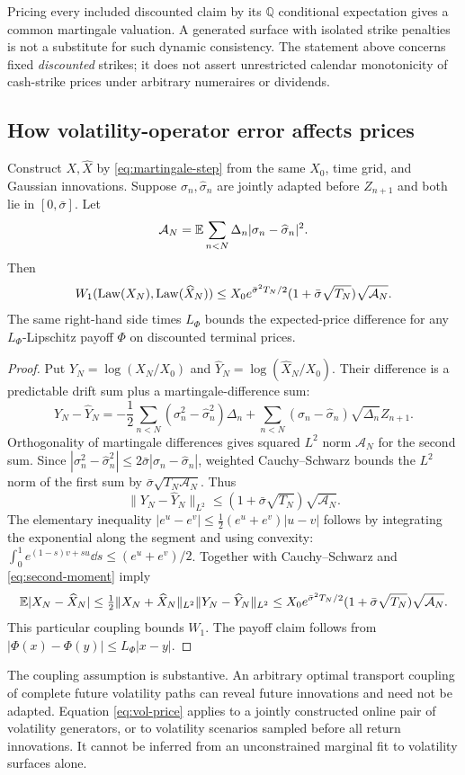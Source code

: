 Pricing every included discounted claim by its $\mathbb Q$ conditional expectation gives a common martingale valuation. A generated surface with isolated strike penalties is not a substitute for such dynamic consistency. The statement above concerns fixed \emph{discounted} strikes; it does not assert unrestricted calendar monotonicity of cash-strike prices under arbitrary numeraires or dividends.

\subsection{How volatility-operator error affects prices}
\begin{theorem}\label{thm:vol-price}
Construct $X,\widehat X$ by \eqref{eq:martingale-step} from the same $X_0$, time grid, and Gaussian innovations. Suppose $\sigma_n,\widehat\sigma_n$ are jointly adapted before $Z_{n+1}$ and both lie in $[0,\bar\sigma]$. Let
\[
 \mathcal A_N=\mathbb E\sum_{n<N}\Delta_n|\sigma_n-\widehat\sigma_n|^2.
\]
Then
\begin{equation}\label{eq:vol-price}
 W_1(\operatorname{Law}(X_N),\operatorname{Law}(\widehat X_N))
 \le X_0e^{\bar\sigma^2T_N/2}
       (1+\bar\sigma\sqrt{T_N})\sqrt{\mathcal A_N}.
\end{equation}
The same right-hand side times $L_\Phi$ bounds the expected-price difference for any $L_\Phi$-Lipschitz payoff $\Phi$ on discounted terminal prices.
\end{theorem}
\begin{proof}
Put $Y_N=\log(X_N/X_0)$ and $\widehat Y_N=\log(\widehat X_N/X_0)$.
Their difference is a predictable drift sum plus a martingale-difference sum:
\[
 Y_N-\widehat Y_N
 =-\frac12\sum_{n<N}(\sigma_n^2-\widehat\sigma_n^2)\Delta_n
 +\sum_{n<N}(\sigma_n-\widehat\sigma_n)\sqrt{\Delta_n}Z_{n+1}.
\]
Orthogonality of martingale differences gives squared $L^2$ norm
$\mathcal A_N$ for the second sum. Since
$|\sigma_n^2-\widehat\sigma_n^2|\le2\bar\sigma|\sigma_n-\widehat\sigma_n|$,
weighted Cauchy--Schwarz bounds the $L^2$ norm of the first sum by
$\bar\sigma\sqrt{T_N\mathcal A_N}$. Thus
\[
 \|Y_N-\widehat Y_N\|_{L^2}
 \le(1+\bar\sigma\sqrt{T_N})\sqrt{\mathcal A_N}.
\]
The elementary inequality
$|e^u-e^v|\le\tfrac12(e^u+e^v)|u-v|$ follows by integrating the exponential along the segment and using convexity:
$\int_0^1e^{(1-s)v+su}\dd s\le(e^u+e^v)/2$.
Together with Cauchy--Schwarz and
\eqref{eq:second-moment} imply
\[
 \mathbb E|X_N-\widehat X_N|
 \le\tfrac12\|X_N+\widehat X_N\|_{L^2}\|Y_N-\widehat Y_N\|_{L^2}
 \le X_0e^{\bar\sigma^2T_N/2}
       (1+\bar\sigma\sqrt{T_N})\sqrt{\mathcal A_N}.
\]
This particular coupling bounds $W_1$. The payoff claim follows from
$|\Phi(x)-\Phi(y)|\le L_\Phi|x-y|$.
\end{proof}

The coupling assumption is substantive. An arbitrary optimal transport coupling of complete future volatility paths can reveal future innovations and need not be adapted. Equation \eqref{eq:vol-price} applies to a jointly constructed online pair of volatility generators, or to volatility scenarios sampled before all return innovations. It cannot be inferred from an unconstrained marginal fit to volatility surfaces alone.
